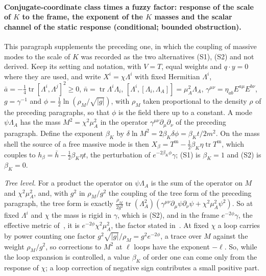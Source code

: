 \paragraph{Conjugate-coordinate class times a fuzzy factor: response of the scale of \(K\) to the frame, the exponent of the \(K\) masses and the scalar channel of the static response (conditional; bounded obstruction).}
This paragraph supplements the preceding one, in which the coupling of massive modes to the scale of \(K\) was recorded as the two alternatives (S1), (S2) and not derived. Keep its setting and notation, with \(V=T\), equal weights and \(q\cdot y=0\) where they are used, and write \(X^i=\chi\Lambda^i\) with fixed Hermitian \(\Lambda^i\), \(\bar a=-\tfrac14\operatorname{tr}[\Lambda^i,\Lambda^j]^2\ge0\), \(\bar n=\operatorname{tr}\Lambda^i\Lambda_i\), \([\Lambda^i,[\Lambda_i,\Lambda_A]]=\mu_A^2\Lambda_A\), \(\gamma^{\mu\nu}=\eta_{ab}E^{a\mu}E^{b\nu}\), \(g=\gamma^{-1}\) and \(\phi=\tfrac12\ln(\rho_M/\sqrt{|g|})\), with \(\rho_M\) taken proportional to the density \(\rho\) of the preceding paragraphs, so that \(\phi\) is the field there up to a constant. A mode \(\psi\Lambda_A\) has the mass \(M^2=\chi^2\mu_A^2\) in the operator \(\gamma^{\mu\nu}\partial_\mu\partial_\nu\) of the preceding paragraph. Define the exponent \(\beta_K\) by \(\delta\ln M^2=2\beta_K\delta\phi=\beta_Kt/2m^2\). On the mass shell the source of a free massive mode is then \(X_\beta=T^{\mathrm m}-\tfrac12\beta_K\eta\operatorname{tr}T^{\mathrm m}\), which couples to \(h_\beta=\bar h-\tfrac12\beta_K\eta t\), the perturbation of \(e^{-2\beta_K\phi}\gamma\); (S1) is \(\beta_K=1\) and (S2) is \(\beta_K=0\).

\emph{Tree level.} For a product the operator on \(\psi\Lambda_A\) is the sum of the operator on \(M\) and \(\chi^2\mu_A^2\), and, with \(g^2\) in \(\rho_M/g^2\) the coupling of the tree form of the preceding paragraph, the tree form is exactly \(\tfrac{\rho_M}{2g^2}\operatorname{tr}(\Lambda_A^2)(\gamma^{\mu\nu}\partial_\mu\psi\partial_\nu\psi+\chi^2\mu_A^2\psi^2)\). So at fixed \(\Lambda^i\) and \(\chi\) the mass is rigid in \(\gamma\), which is (S2), and in the frame \(e^{-2\phi}\gamma\), the effective metric of~\cite{Steinacker2026}, it is \(e^{-2\phi}\chi^2\mu_A^2\), the factor stated in~\cite{MantaSteinacker2025b}. At fixed \(\chi\) a loop carries by power counting one factor \(g^2\sqrt{|g|}/\rho_M=g^2e^{-2\phi}\), a trace over \(M\) against the weight \(\rho_M/g^2\), so corrections to \(M^2\) at \(\ell\) loops have the exponent \(-\ell\). So, while the loop expansion is controlled, a value \(\beta_K\) of order one can come only from the response of \(\chi\); a loop correction of negative sign contributes a small positive part.

